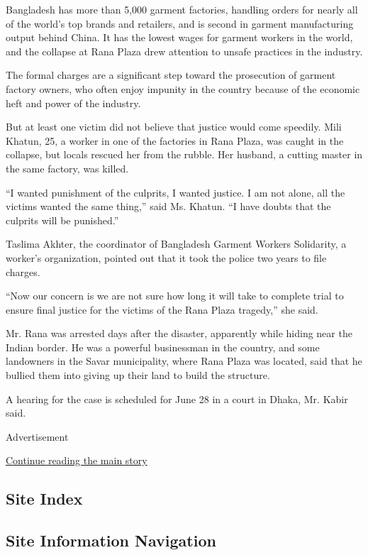 Bangladesh has more than 5,000 garment factories, handling orders for
nearly all of the world's top brands and retailers, and is second in
garment manufacturing output behind China. It has the lowest wages for
garment workers in the world, and the collapse at Rana Plaza drew
attention to unsafe practices in the industry.

The formal charges are a significant step toward the prosecution of
garment factory owners, who often enjoy impunity in the country because
of the economic heft and power of the industry.

But at least one victim did not believe that justice would come
speedily. Mili Khatun, 25, a worker in one of the factories in Rana
Plaza, was caught in the collapse, but locals rescued her from the
rubble. Her husband, a cutting master in the same factory, was killed.

``I wanted punishment of the culprits, I wanted justice. I am not alone,
all the victims wanted the same thing,'' said Ms. Khatun. ``I have
doubts that the culprits will be punished.''

Taslima Akhter, the coordinator of Bangladesh Garment Workers
Solidarity, a worker's organization, pointed out that it took the police
two years to file charges.

``Now our concern is we are not sure how long it will take to complete
trial to ensure final justice for the victims of the Rana Plaza
tragedy,'' she said.

Mr. Rana was arrested days after the disaster, apparently while hiding
near the Indian border. He was a powerful businessman in the country,
and some landowners in the Savar municipality, where Rana Plaza was
located, said that he bullied them into giving up their land to build
the structure.

A hearing for the case is scheduled for June 28 in a court in Dhaka, Mr.
Kabir said.

Advertisement

\protect\hyperlink{after-bottom}{Continue reading the main story}

\hypertarget{site-index}{%
\subsection{Site Index}\label{site-index}}

\hypertarget{site-information-navigation}{%
\subsection{Site Information
Navigation}\label{site-information-navigation}}

